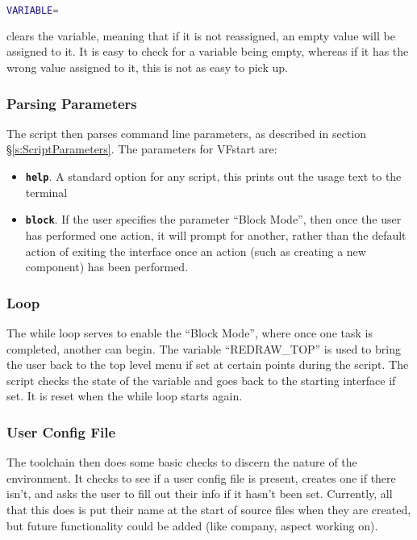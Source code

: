 \documentclass[a4paper, oneside, 11pt, titlepage, onecolumn, openright]{report}
\begin{document}
\begin{lstlisting}[frame=trBL, breaklines=true, language = bash]				
VARIABLE=			
\end{lstlisting}				

clears the variable, meaning that if it is not reassigned, an empty value will be assigned to it. It is easy to check for a variable being empty, whereas if it has the wrong value assigned to it, this is not as easy to pick up.

\subsubsection{Parsing Parameters}
			\label{sss:VFstartPassingParameters}
			The script then parses command line parameters, as described in section \S\ref{s:ScriptParameters}.
			The parameters for VFstart are:
			
\begin{itemize}

\item \texttt{\textbf{help}}. A standard option for any script, this prints out the usage text to the terminal

\item \texttt{\textbf{block}}. If the user specifies the parameter ``Block Mode'', then once the user has performed one action, it will prompt for another, rather than the default action of exiting the interface once an action (such as creating a new component) has been performed.
\end{itemize}

\subsubsection{Loop}
			\label{sss:VFstartLoop}
			The while loop serves to enable the ``Block Mode'', where once one task is completed, another can begin.
			The variable ``REDRAW\_TOP'' is used to bring the user back to the top level menu if set at certain points during the script. The script checks the state of the variable and goes back to the starting interface if set. It is reset when the while loop starts again.
			
\subsubsection{User Config File}
			\label{sss:VFstartUserConfigFile}
			
			The toolchain then does some basic checks to discern the nature of the environment. It checks to see if a user config file is present, creates one if there isn't, and asks the user to fill out their info if it hasn't been set. 
			Currently, all that this does is put their name at the start of source files when they are created, but future functionality could be added (like company, aspect working on).
			
\end{document}

